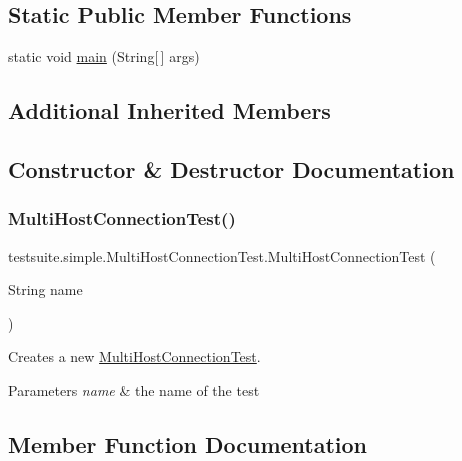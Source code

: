 \subsection*{Static Public Member Functions}
\begin{DoxyCompactItemize}
\item 
static void \mbox{\hyperlink{classtestsuite_1_1simple_1_1_multi_host_connection_test_a57708373d1cad3d5c6f2672e6f3bdd04}{main}} (String\mbox{[}$\,$\mbox{]} args)
\end{DoxyCompactItemize}
\subsection*{Additional Inherited Members}


\subsection{Constructor \& Destructor Documentation}
\mbox{\label{classtestsuite_1_1simple_1_1_multi_host_connection_test_a56eb52dfde0f334b08b56d1065f60104}} 
\subsubsection{\texorpdfstring{Multi\+Host\+Connection\+Test()}{MultiHostConnectionTest()}}
{\footnotesize\ttfamily testsuite.\+simple.\+Multi\+Host\+Connection\+Test.\+Multi\+Host\+Connection\+Test (\begin{DoxyParamCaption}\item[{String}]{name }\end{DoxyParamCaption})}

Creates a new \mbox{\hyperlink{classtestsuite_1_1simple_1_1_multi_host_connection_test}{Multi\+Host\+Connection\+Test}}.


\begin{DoxyParams}{Parameters}
{\em name} & the name of the test \\
\hline
\end{DoxyParams}


\subsection{Member Function Documentation}
\mbox{\label{classtestsuite_1_1simple_1_1_multi_host_connection_test_a57708373d1cad3d5c6f2672e6f3bdd04}} 
